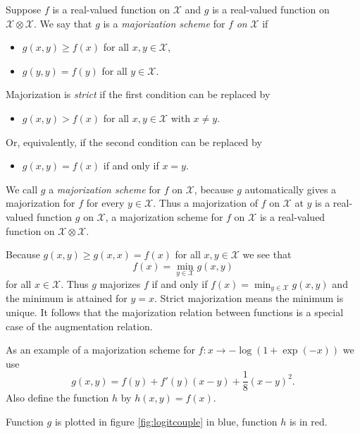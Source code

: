 \documentclass[
  12pt,
]{book}
\providecommand{\tightlist}{%
  \setlength{\itemsep}{0pt}\setlength{\parskip}{0pt}}
\begin{document}
Suppose \(f\) is a real-valued function on \(\mathcal{X}\) and \(g\) is a real-valued function on \(\mathcal{X}\otimes\mathcal{X}\). We say
that \(g\) is a \emph{majorization scheme} for \(f\) \emph{on} \(\mathcal{X}\) if

\begin{itemize}
\tightlist
\item
  \(g(x,y)\geq f(x)\) for all \(x,y\in\mathcal{X}\),
\item
  \(g(y,y)=f(y)\) for all \(y\in\mathcal{X}\).
\end{itemize}

Majorization is \emph{strict} if the first condition can be replaced by

\begin{itemize}
\tightlist
\item
  \(g(x,y)>f(x)\) for all \(x,y\in\mathcal{X}\) with \(x\not= y\).
\end{itemize}

Or, equivalently, if the second condition can be replaced by

\begin{itemize}
\tightlist
\item
  \(g(x,y)=f(x)\) if and only if \(x=y\).
\end{itemize}

We call \(g\) a \emph{majorization scheme} for \(f\) on \(\mathcal{X}\), because \(g\) automatically gives a majorization for \(f\) for every \(y\in\mathcal{X}\). Thus a majorization of \(f\) on \(\mathcal{X}\) at \(y\) is a real-valued function \(g\) on \(\mathcal{X}\), a majorization scheme for \(f\) on \(\mathcal{X}\) is a real-valued function on \(\mathcal{X}\otimes\mathcal{X}\).

Because \(g(x,y)\geq g(x,x)=f(x)\) for all \(x,y\in\mathcal{X}\) we see that
\[
f(x)=\min_{y\in\mathcal{X}}g(x,y)
\]
for all \(x\in\mathcal{X}\). Thus \(g\) majorizes \(f\) if and only if \(f(x)=\min_{y\in\mathcal{X}} g(x,y)\) and the minimum is attained for \(y=x.\) Strict majorization means the minimum is unique. It follows that the majorization relation between functions is a special case of the augmentation relation.

As an example of a majorization scheme for \(f:x\rightarrow -\log(1+\exp(-x))\) we use
\[
g(x,y)=f(y)+f'(y)(x-y)+\frac18(x-y)^2.
\]
Also define the function \(h\) by \(h(x,y)=f(x)\).

Function \(g\) is plotted in figure \ref{fig:logitcouple} in blue, function \(h\) is in red.
\end{document}
